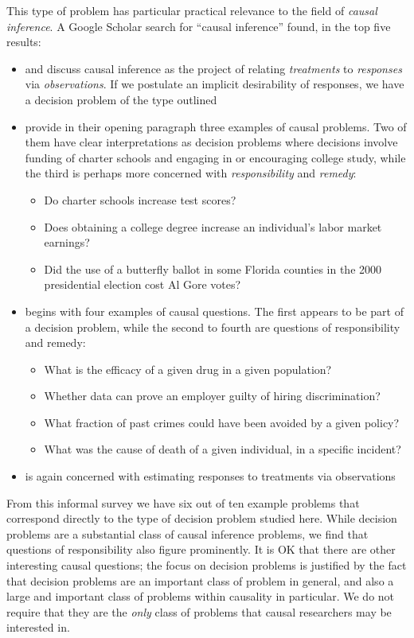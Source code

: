This type of problem has particular practical relevance to the field of \emph{causal inference}. A Google Scholar search for ``causal inference'' found, in the top five results: 
\begin{itemize}
	\item \citet{holland_statistics_1986} and \citet{frangakis_principal_2002} discuss causal inference as the project of relating \emph{treatments} to \emph{responses} via \emph{observations}. If we postulate an implicit desirability of responses, we have a decision problem of the type outlined
	\item \citet{morgan_counterfactuals_2014} provide in their opening paragraph three examples of causal problems. Two of them have clear interpretations as decision problems where decisions involve funding of charter schools and engaging in or encouraging college study, while the third is perhaps more concerned with \emph{responsibility} and \emph{remedy}:
	\begin{itemize}
		\item Do charter schools increase test scores?
		\item Does obtaining a college degree increase an individual's labor market earnings?
		\item Did the use of a butterfly ballot in some Florida counties in the 2000 presidential election cost Al Gore votes?
	\end{itemize}
	\item \citet{pearl_causal_2009} begins with four examples of causal questions. The first appears to be part of a decision problem, while the second to fourth are questions of responsibility and remedy:
	\begin{itemize}
		\item What is the efficacy of a given drug in a given population? 
		\item Whether data can prove an employer guilty of hiring discrimination? 
		\item What fraction of past crimes could have been avoided by a given policy? 
		\item What was the cause of death of a given individual, in a specific incident?
	\end{itemize}
	\item \citet{robins_marginal_2000} is again concerned with estimating responses to treatments via observations
\end{itemize} 
From this informal survey we have six out of ten example problems that correspond directly to the type of decision problem studied here. While decision problems are a substantial class of causal inference problems, we find that questions of responsibility also figure prominently. It is OK that there are other interesting causal questions; the focus on decision problems is justified by the fact that decision problems are an important class of problem in general, and also a large and important class of problems within causality in particular. We do not require that they are the \emph{only} class of problems that causal researchers may be interested in.

